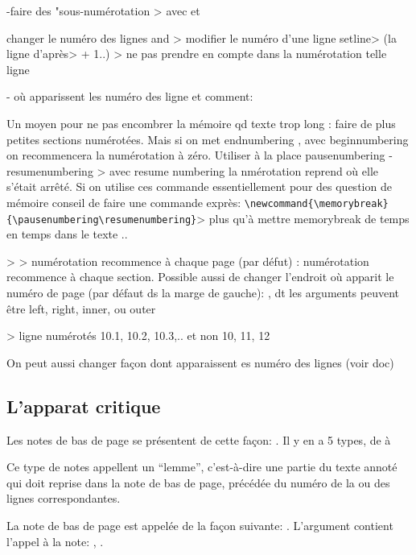 -faire des "sous-numérotation
> avec  
et 

changer le numéro des lignes
 and  > modifier le numéro d'une ligne 
setline> (la ligne d'après> + 1..)
 > ne pas prendre en compte dans la numérotation telle ligne

- où apparissent les numéro des ligne et comment: %


Un moyen pour ne pas encombrer la mémoire qd texte trop long : faire de plus petites sections numérotées. Mais si on met endnumbering ,  avec beginnumbering on recommencera la numérotation à zéro.  Utiliser à la place pausenumbering - resumenumbering > avec resume numbering la nmérotation reprend où elle s'était arrêté. Si on utilise ces commande essentiellement pour des question de mémoire conseil de faire une commande exprès: \verb|\newcommand{\memorybreak}{\pausenumbering\resumenumbering}|> plus qu'à mettre memorybreak de temps en temps dans le texte ..

 >  > numérotation recommence à chaque page  (par défut) : numérotation recommence à chaque section.
Possible aussi de changer l'endroit où apparit le numéro de page (par défaut ds la marge de gauche): , dt les arguments peuvent être left, right, inner, ou outer

  > ligne numérotés 10.1, 10.2, 10.3,.. et non 10, 11, 12 

On peut aussi changer façon dont apparaissent es numéro des lignes (voir doc)



\subsection{L'apparat critique}

Les notes de bas de page se présentent de cette façon:  . Il y en a 5 types, de  à 


Ce type de notes appellent un \enquote{lemme}, c'est-à-dire une partie du texte annoté qui doit reprise dans la note de bas de page, précédée du numéro de la ou des lignes correspondantes. 

La note de bas de page est appelée de la façon suivante:  . L'argument  contient l'appel à la note: , .

